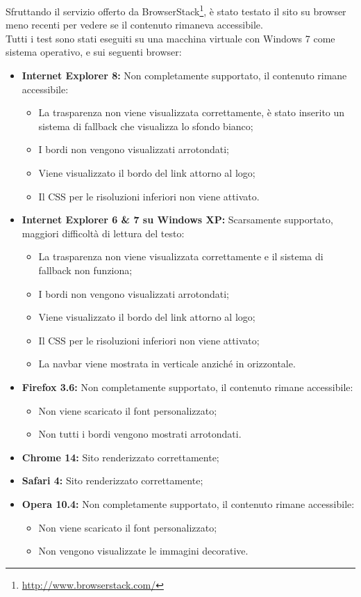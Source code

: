Sfruttando il servizio offerto da BrowserStack\footnote{\url{http://www.browserstack.com/}}, è stato testato il sito su browser meno recenti per vedere se il contenuto rimaneva accessibile. \\
Tutti i test sono stati eseguiti su una macchina virtuale con Windows 7 come sistema operativo, e sui seguenti browser:
\begin{itemize}
\item \textbf{Internet Explorer 8:} Non completamente supportato, il contenuto rimane accessibile:
\begin{itemize}
\item La trasparenza non viene visualizzata correttamente, è stato inserito un sistema di fallback che visualizza lo sfondo bianco;
\item I bordi non vengono visualizzati arrotondati;
\item Viene visualizzato il bordo del link attorno al logo;
\item Il CSS per le risoluzioni inferiori non viene attivato.
\end{itemize}

\item \textbf{Internet Explorer 6 \& 7 su Windows XP:} Scarsamente supportato, maggiori difficoltà di lettura del testo:
\begin{itemize}
\item La trasparenza non viene visualizzata correttamente e il sistema di fallback non funziona;
\item I bordi non vengono visualizzati arrotondati;
\item Viene visualizzato il bordo del link attorno al logo;
\item Il CSS per le risoluzioni inferiori non viene attivato;
\item La navbar viene mostrata in verticale anziché in orizzontale.
\end{itemize}

\item \textbf{Firefox 3.6:} Non completamente supportato, il contenuto rimane accessibile:
\begin{itemize}
\item Non viene scaricato il font personalizzato;
\item Non tutti i bordi vengono mostrati arrotondati. 
\end{itemize}

\item \textbf{Chrome 14:} Sito renderizzato correttamente;

\item \textbf{Safari 4:} Sito renderizzato correttamente;

\item \textbf{Opera 10.4:} Non completamente supportato, il contenuto rimane accessibile:
\begin{itemize}
\item Non viene scaricato il font personalizzato;
\item Non vengono visualizzate le immagini decorative.
\end{itemize}

\end{itemize}